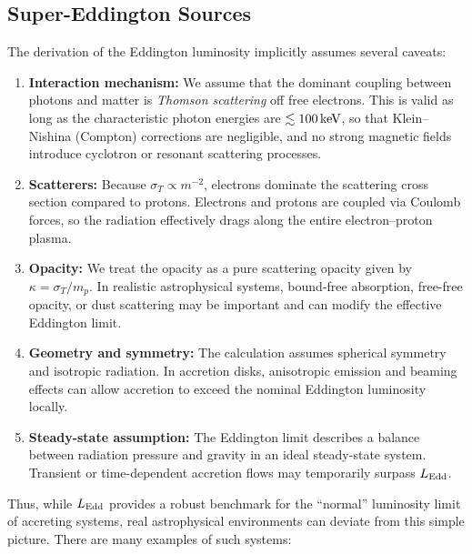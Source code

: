 \subsection{Super-Eddington Sources}
The derivation of the Eddington luminosity implicitly assumes several caveats:
\vspace{0.25cm}
\begin{enumerate}
    \item \textbf{Interaction mechanism:} We assume that the dominant coupling between photons and matter is \emph{Thomson scattering} off free electrons. This is valid as long as the characteristic photon energies are $\lesssim 100 \,{\rm keV}$, so that Klein--Nishina (Compton) corrections are negligible, and no strong magnetic fields introduce cyclotron or resonant scattering processes.
    \item \textbf{Scatterers:} Because $\sigma_T \propto m^{-2}$, electrons dominate the scattering cross section compared to protons. Electrons and protons are coupled via Coulomb forces, so the radiation effectively drags along the entire electron--proton plasma.
    \item \textbf{Opacity:} We treat the opacity as a pure scattering opacity given by $\kappa = \sigma_T/m_p$. In realistic astrophysical systems, bound-free absorption, free-free opacity, or dust scattering may be important and can modify the effective Eddington limit.
    \item \textbf{Geometry and symmetry:} The calculation assumes spherical symmetry and isotropic radiation. In accretion disks, anisotropic emission and beaming effects can allow accretion to exceed the nominal Eddington luminosity locally.
    \item \textbf{Steady-state assumption:} The Eddington limit describes a balance between radiation pressure and gravity in an ideal steady-state system. Transient or time-dependent accretion flows may temporarily surpass $L_{\rm Edd}$.
\end{enumerate}
\vspace{0.25cm}
Thus, while $L_{\rm Edd}$ provides a robust benchmark for the ``normal'' luminosity limit of accreting systems, real astrophysical environments can deviate from this simple picture. There are many examples of such systems:
\vspace{0.25cm}
